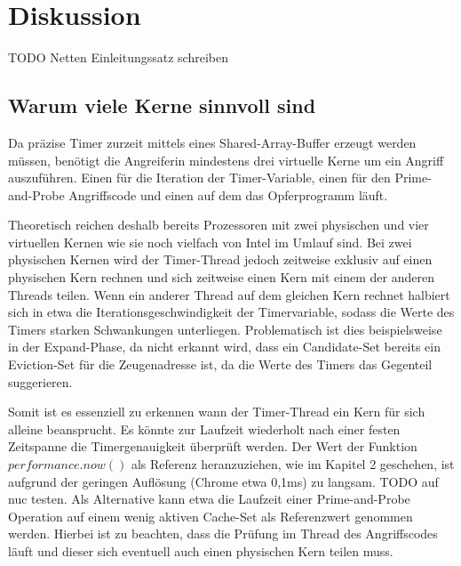 \chapter{Diskussion}
\label{chapter:discussion}

TODO Netten Einleitungssatz schreiben


\section{Warum viele Kerne sinnvoll sind}
Da präzise Timer zurzeit mittels eines Shared-Array-Buffer erzeugt werden müssen, benötigt die Angreiferin mindestens drei virtuelle Kerne um ein Angriff auszuführen. Einen für die Iteration der Timer-Variable, einen für den Prime-and-Probe Angriffscode und einen auf dem das Opferprogramm läuft.

Theoretisch reichen deshalb bereits Prozessoren mit zwei physischen und vier virtuellen Kernen wie sie noch vielfach von Intel im Umlauf sind. Bei zwei physischen Kernen wird der Timer-Thread jedoch zeitweise exklusiv auf einen physischen Kern rechnen und sich zeitweise einen Kern mit einem der anderen Threads teilen.
Wenn ein anderer Thread auf dem gleichen Kern rechnet halbiert sich in etwa die Iterationsgeschwindigkeit der Timervariable, sodass die Werte des Timers starken Schwankungen unterliegen.
Problematisch ist dies beispielsweise in der Expand-Phase, da nicht erkannt wird, dass ein Candidate-Set bereits ein Eviction-Set für die Zeugenadresse ist, da die Werte des Timers das Gegenteil suggerieren.

Somit ist es essenziell zu erkennen wann der Timer-Thread ein Kern für sich alleine beansprucht.
Es könnte zur Laufzeit wiederholt nach einer festen Zeitspanne die Timergenauigkeit überprüft werden.
Der Wert der Funktion $performance.now()$ als Referenz heranzuziehen, wie im Kapitel 2 geschehen, ist aufgrund der geringen Auflösung (Chrome etwa 0,1ms) zu langsam.
TODO auf nuc testen.
Als Alternative kann etwa die Laufzeit einer Prime-and-Probe Operation auf einem wenig aktiven Cache-Set als Referenzwert genommen werden.
Hierbei ist zu beachten, dass die Prüfung im Thread des Angriffscodes läuft und dieser sich eventuell auch einen physischen Kern teilen muss.


